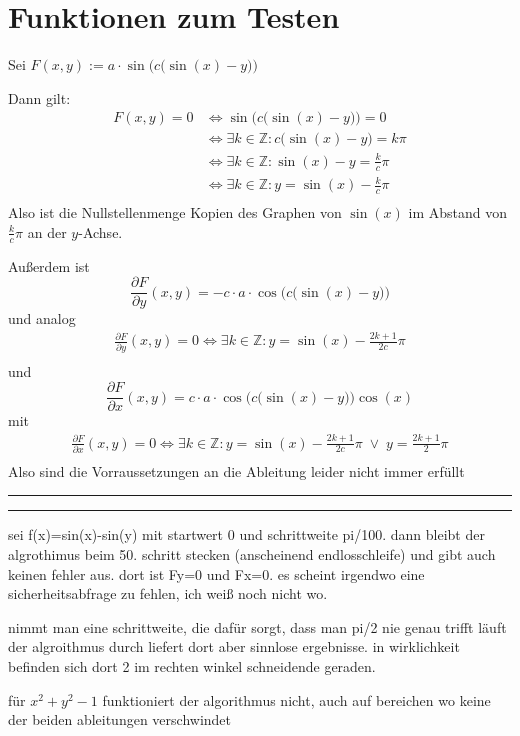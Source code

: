 \documentclass[a4paper]{article}
\theoremstyle{definition}
\newcommand{\Z}{\mathbb{Z}}
\begin{document}
\section{Funktionen zum Testen}

Sei $F(x,y) := a \cdot \sin \Big(c \big( \sin(x) -y \big)\Big) $

Dann gilt:
\begin{align*}
F(x,y)=0 &\iff \sin \Big(c \big( \sin(x) -y \big)\Big) = 0 \\
&\iff \exists k \in \Z :  c \big( \sin(x) -y \big) = k \pi \\
&\iff \exists k \in \Z :   \sin(x) -y  = \frac{k}{c} \pi \\
&\iff \exists k \in \Z :    y  = \sin(x) -\frac{k}{c} \pi \\
\end{align*}
Also ist die Nullstellenmenge Kopien des Graphen von $\sin(x)$ im Abstand von $\frac{k}{c} \pi$ an der $y$-Achse.

Außerdem ist
\[
\frac{\partial F}{\partial y}(x,y) =  -c\cdot a \cdot\cos \Big(c \big( \sin(x) -y \big)\Big)
\]
und analog
\begin{align*}
\frac{\partial F}{\partial y}(x,y) =0 \iff \exists k \in \Z :    y  = \sin(x) -\frac{2k+1}{2c} \pi \\
\end{align*}
und 
\[
\frac{\partial F}{\partial x}(x,y) =  c \cdot a \cdot\cos \Big(c \big( \sin(x) -y \big)\Big) \cos(x)
\]
mit
\begin{align*}
\frac{\partial F}{\partial x}(x,y) =0 \iff \exists k \in \Z :    y  = \sin(x) -\frac{2k+1}{2c} \pi \;\lor\;  y= \frac{2k+1}{2} \pi\\
\end{align*}
Also sind die Vorraussetzungen an die Ableitung leider nicht immer erfüllt

\hrule

\hrule 
sei f(x)=sin(x)-sin(y) mit startwert 0 und schrittweite pi/100. dann bleibt der algrothimus beim 50. schritt stecken (anscheinend endlosschleife) und gibt auch keinen fehler aus. dort ist Fy=0 und Fx=0. es scheint irgendwo eine sicherheitsabfrage zu fehlen, ich weiß noch nicht wo.

nimmt man eine schrittweite, die dafür sorgt, dass man pi/2 nie genau trifft läuft der algroithmus durch liefert dort aber sinnlose ergebnisse. in wirklichkeit befinden sich dort 2 im rechten winkel schneidende geraden. 

für $x^2+y^2-1$ funktioniert der algorithmus nicht, auch auf bereichen wo keine der beiden ableitungen verschwindet
\end{document}

